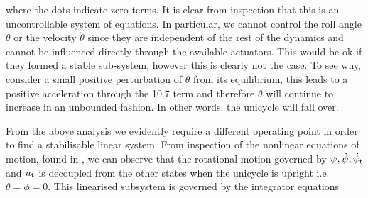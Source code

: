 where the dots indicate zero terms. It is clear from inspection that this is an uncontrollable system of equations. In particular, we cannot control the roll angle $\theta$ or the velocity $\dot\theta$ since they are independent of the rest of the dynamics and cannot be influenced directly through the available actuators. This would be ok if they formed a stable sub-system, however this is clearly not the case. To see why, consider a small positive perturbation of $\theta$ from its equilibrium, this leads to a positive acceleration through the 10.7 term and therefore $\theta$ will continue to increase in an unbounded fashion. In other words, the unicycle will fall over.

From the above analysis we evidently require a different operating point in order to find a stabilisable linear system. From inspection of the nonlinear equations of motion, found in , we can observe that the rotational motion governed by $\psi, \dot\psi, \dot\psi_{\text{t}}$ and $u_{\text{t}}$ is decoupled from the other states when the unicycle is upright i.e.\ $\theta = \phi = 0$. This linearised subsystem is governed by the integrator equations
